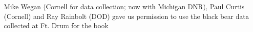 Mike Wegan (Cornell for data collection; now with Michigan DNR), Paul Curtis (Cornell) and 
Ray Rainbolt (DOD) gave us permission to use the black bear data collected at Ft. Drum for the book 